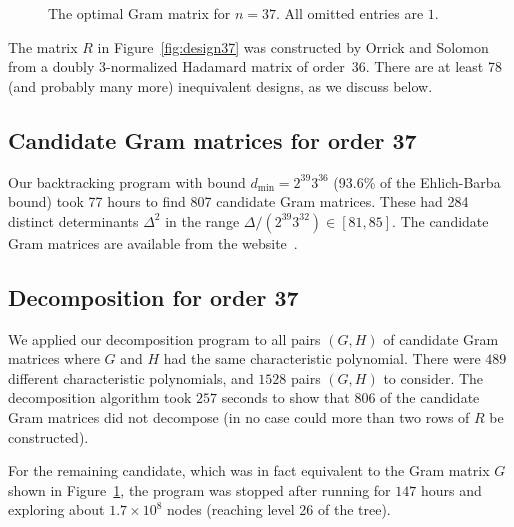 \documentclass[11pt,a4paper]{article}
\begin{document}
\begin{center}
\begin{figure}[hbp]

\caption{The optimal Gram matrix for $n=37$.
	 All omitted entries are $1$.}
\label{fig:gram37}
\end{figure}
\end{center}


The matrix $R$ in Figure~\ref{fig:design37} was constructed by Orrick
and Solomon from a doubly 3-normalized Hadamard matrix of order~36.
There are at least 78 (and probably many more) inequivalent designs,
as we discuss below.

\subsection{Candidate Gram matrices for order 37}

Our backtracking program with bound $d_{\min} = 2^{39}3^{36}$
(93.6\% of the Ehlich-Barba bound) took 
77 hours %
to find 807 candidate Gram matrices. These had 284 distinct determinants
$\Delta^2$ in the range 
$\Delta/({2^{39}3^{32}}) \in [81,85].$
The candidate Gram matrices are available from the website~\cite{www37}.

\subsection{Decomposition for order 37}		\label{subsec:decomp37}

We applied our decomposition program to all pairs $(G,H)$ of candidate Gram
matrices where $G$ and $H$ had the same characteristic polynomial.
There were $489$ different characteristic polynomials,
and $1528$ pairs $(G,H)$ to consider.
The decomposition algorithm took 
$257$ seconds %
to show that $806$ of the
candidate Gram matrices did not decompose (in no case could more than two
rows of $R$ be constructed).

For the remaining candidate, which was in fact equivalent to the Gram matrix
$G$ shown in Figure~\ref{fig:gram37}, the program was stopped after running
for $147$ hours and exploring about $1.7 \times 10^8$ nodes (reaching level 26
of the tree). 
\end{document}
